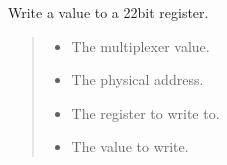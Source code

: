 \documentclass[letterpaper,10pt,english]{sphinxmanual}
\begin{document}
\begin{fulllineitems}
\label{\detokenize{cplddocs:phy_marvell_88X2222_init.write22}}
\pysigstartsignatures
{}
\pysigstopsignatures
\sphinxAtStartPar
Write a value to a 22\sphinxhyphen{}bit register.
\begin{quote}\begin{description}
\begin{itemize}
\item {} 
\sphinxAtStartPar
{} \textendash{} The multiplexer value.

\item {} 
\sphinxAtStartPar
{} \textendash{} The physical address.

\item {} 
\sphinxAtStartPar
{} \textendash{} The register to write to.

\item {} 
\sphinxAtStartPar
{} \textendash{} The value to write.

\end{itemize}

\end{description}\end{quote}

\end{fulllineitems}

\end{document}
